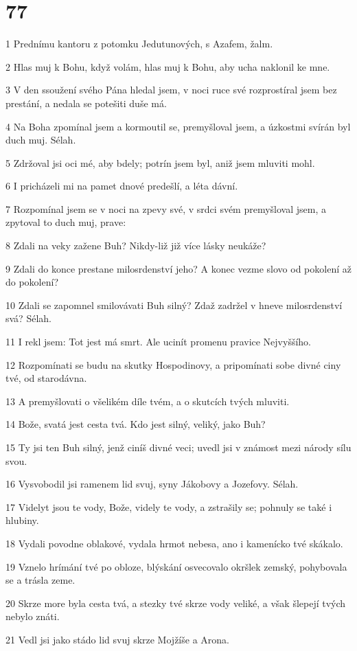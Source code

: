 \chapter{77}

\par 1 Prednímu kantoru z potomku Jedutunových, s Azafem, žalm.
\par 2 Hlas muj k Bohu, když volám, hlas muj k Bohu, aby ucha naklonil ke mne.
\par 3 V den ssoužení svého Pána hledal jsem, v noci ruce své rozprostíral jsem bez prestání, a nedala se potešiti duše má.
\par 4 Na Boha zpomínal jsem a kormoutil se, premyšloval jsem, a úzkostmi svírán byl duch muj. Sélah.
\par 5 Zdržoval jsi oci mé, aby bdely; potrín jsem byl, aniž jsem mluviti mohl.
\par 6 I pricházeli mi na pamet dnové predešlí, a léta dávní.
\par 7 Rozpomínal jsem se v noci na zpevy své, v srdci svém premyšloval jsem, a zpytoval to duch muj, prave:
\par 8 Zdali na veky zažene Buh? Nikdy-liž již více lásky neukáže?
\par 9 Zdali do konce prestane milosrdenství jeho? A konec vezme slovo od pokolení až do pokolení?
\par 10 Zdali se zapomnel smilovávati Buh silný? Zdaž zadržel v hneve milosrdenství svá? Sélah.
\par 11 I rekl jsem: Tot jest má smrt. Ale ucinít promenu pravice Nejvyššího.
\par 12 Rozpomínati se budu na skutky Hospodinovy, a pripomínati sobe divné ciny tvé, od starodávna.
\par 13 A premyšlovati o všelikém díle tvém, a o skutcích tvých mluviti.
\par 14 Bože, svatá jest cesta tvá. Kdo jest silný, veliký, jako Buh?
\par 15 Ty jsi ten Buh silný, jenž ciníš divné veci; uvedl jsi v známost mezi národy sílu svou.
\par 16 Vysvobodil jsi ramenem lid svuj, syny Jákobovy a Jozefovy. Sélah.
\par 17 Videlyt jsou te vody, Bože, videly te vody, a zstrašily se; pohnuly se také i hlubiny.
\par 18 Vydali povodne oblakové, vydala hrmot nebesa, ano i kamenícko tvé skákalo.
\par 19 Vznelo hrímání tvé po obloze, blýskání osvecovalo okršlek zemský, pohybovala se a trásla zeme.
\par 20 Skrze more byla cesta tvá, a stezky tvé skrze vody veliké, a však šlepejí tvých nebylo znáti.
\par 21 Vedl jsi jako stádo lid svuj skrze Mojžíše a Arona.


